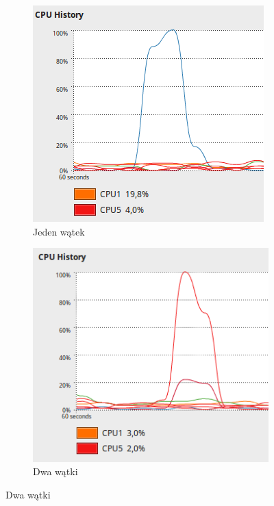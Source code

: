 \documentclass[10pt,a4paper]{article}
\begin{document}
\begin{figure}[H]
    \centering
    \begin{subfigure}[b]{0.4\textwidth}
        \includegraphics[width=\textwidth]{11-1.png}
        \caption{Jeden wątek}
        \label{fig:11-1}
    \end{subfigure}
    \begin{subfigure}[b]{0.4\textwidth}
        \includegraphics[width=\textwidth]{11-2.png}
        \caption{Dwa wątki}
        \label{fig:11-2}
    \end{subfigure}
    

\end{figure}
\end{document}
